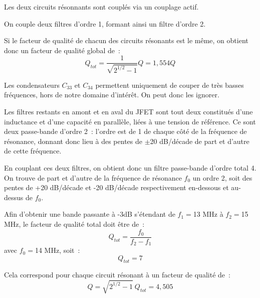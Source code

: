 \documentclass{article}
\begin{document}
Les deux circuits résonnants sont couplés via un couplage actif.


On couple deux filtres d'ordre 1, formant ainsi un filtre d'ordre 2.

Si le facteur de qualité de chacun des circuits résonants est le même, on obtient donc un facteur de qualité global de~:
\begin{equation*}
Q_{tot} = \frac{1}{\sqrt{2^{1/2}-1}}Q = 1,554 Q
\end{equation*}



Les condensateurs $C_{33}$ et $C_{34}$ permettent uniquement de couper de très basses fréquences, hors de notre domaine d'intérêt. On peut donc les ignorer.

Les filtres restants en amont et en aval du JFET sont tout deux constitués d'une inductance et d'une capacité en parallèle, liées à une tension de référence. Ce sont deux passe-bande d'ordre 2~: l'ordre est de 1 de chaque côté de la fréquence de résonance, donnant donc lieu à des pentes de $\pm$20 dB/décade de part et d'autre de cette fréquence.

En couplant ces deux filtres, on obtient donc un filtre passe-bande d'ordre total 4. On trouve de part et d'autre de la fréquence de résonance $f_0$ un ordre 2, soit des pentes de +20 dB/décade et -20 dB/décade respectivement en-dessous et au-dessus de $f_0$.



Afin d'obtenir une bande passante à -3dB s'étendant de $f_1 = $13 MHz à $f_2 = $15 MHz, le facteur de qualité total doit être de~:
\begin{equation*}
Q_{tot} = \frac{f_0}{f_2-f_1}
\end{equation*}
avec $f_0 = $14 MHz, soit~:
\begin{equation*}
Q_{tot} = 7
\end{equation*}

Cela correspond pour chaque circuit résonant à un facteur de qualité de~:
\begin{equation*}
Q = \sqrt{2^{1/2}-1}~Q_{tot} = 4,505
\end{equation*}




\end{document}
